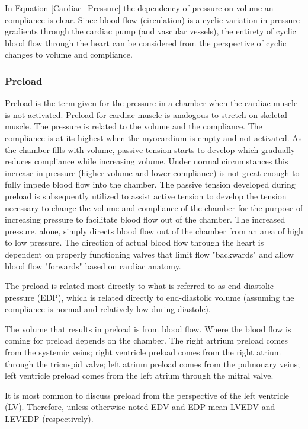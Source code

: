 In Equation \ref{Cardiac_Pressure} the dependency of pressure on volume an compliance is clear. Since blood flow (circulation) is a cyclic variation in pressure gradients through the cardiac pump (and vascular vessels), the entirety of cyclic blood flow through the heart can be considered from the perspective of cyclic changes to volume and compliance. 

\subsubsection{Preload}

Preload is the term given for the pressure in a chamber when the cardiac muscle is not activated. Preload for cardiac muscle is analogous to stretch on skeletal muscle. The pressure is related to the volume and the compliance. The compliance is at its highest when the myocardium is empty and not activated. As the chamber fills with volume, passive tension starts to develop which gradually reduces compliance while increasing volume. Under normal circumstances this increase in pressure (higher volume and lower compliance) is not great enough to fully impede blood flow into the chamber. The passive tension developed during preload is subsequently utilized to assist active tension to develop the tension necessary to change the volume and compliance of the chamber for the purpose of increasing pressure to facilitate blood flow out of the chamber. The increased pressure, alone, simply directs blood flow out of the chamber from an area of high to low pressure. The direction of actual blood flow through the heart is dependent on properly functioning valves that limit flow "backwards" and allow blood flow "forwards" based on cardiac anatomy.

The preload is related most directly to what is referred to as end-diastolic pressure (EDP), which is related directly to end-diastolic volume (assuming the compliance is normal and relatively low during diastole).

The volume that results in preload is from blood flow. Where the blood flow is coming for preload depends on the chamber. The right artrium preload comes from the systemic veins; right ventricle preload comes from the right atrium through the tricuspid valve; left atrium preload comes from the pulmonary veins; left ventricle preload comes from the left atrium through the mitral valve. 

It is most common to discuss preload from the perspective of the left ventricle (LV). Therefore, unless otherwise noted EDV and EDP mean LVEDV and LEVEDP (respectively).

